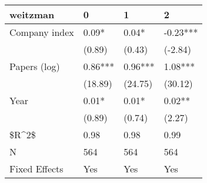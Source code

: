 \begin{tabular}{llll}
\toprule
      weitzman &        0 &        1 &         2 \\
\midrule
 Company index &    0.09* &    0.04* &  -0.23*** \\
               &   (0.89) &   (0.43) &   (-2.84) \\
  Papers (log) &  0.86*** &  0.96*** &   1.08*** \\
               &  (18.89) &  (24.75) &   (30.12) \\
          Year &    0.01* &    0.01* &    0.02** \\
               &   (0.89) &   (0.74) &    (2.27) \\
         \$R\textasciicircum 2\$ &     0.98 &     0.98 &      0.99 \\
             N &      564 &      564 &       564 \\
 Fixed Effects &      Yes &      Yes &       Yes \\
\bottomrule
\end{tabular}
